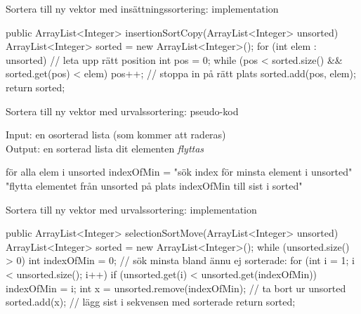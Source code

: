 \documentclass{lecturenotes}
\begin{document}
\begin{Slide}{Sortera till ny vektor med insättningssortering: implementation}
\begin{Code}
public ArrayList<Integer> insertionSortCopy(ArrayList<Integer> unsorted) {
    ArrayList<Integer> sorted = new ArrayList<Integer>();
    for (int elem : unsorted) {
        // leta upp rätt position 
        int pos = 0;  
        while (pos < sorted.size() && sorted.get(pos) < elem) {
            pos++;
        }
        // stoppa in på rätt plats
        sorted.add(pos, elem);
    }
    return sorted;
}
\end{Code}
\end{Slide}

\begin{Slide}{Sortera till ny vektor med urvalssortering: pseudo-kod}

Input: en osorterad lista  (som kommer att raderas)\\
Output: en sorterad lista  dit elementen \emph{flyttas}
\begin{Code}
för alla elem i unsorted {
   indexOfMin = "sök index för minsta element i unsorted"
   "flytta elementet från unsorted på plats indexOfMin till sist i sorted" 
}
\end{Code}
\end{Slide}

\begin{Slide}{Sortera till ny vektor med urvalssortering: implementation}
\begin{Code}
public ArrayList<Integer> selectionSortMove(ArrayList<Integer> unsorted) {
    ArrayList<Integer> sorted = new ArrayList<Integer>();
    while (unsorted.size() > 0) {
        int indexOfMin = 0;
        // sök minsta bland ännu ej sorterade:
        for (int i = 1; i < unsorted.size(); i++) { 
            if (unsorted.get(i) < unsorted.get(indexOfMin)) {
                indexOfMin = i;
            }
        }
        int x = unsorted.remove(indexOfMin);  // ta bort ur unsorted
        sorted.add(x);  // lägg sist i sekvensen med sorterade
    }
    return sorted;
}
\end{Code}
\end{Slide}
\end{document}
